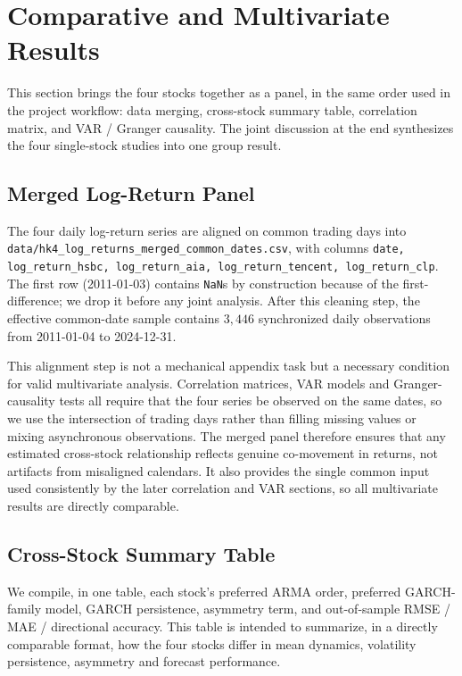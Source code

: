 \documentclass[11pt,a4paper]{article}
\begin{document}
\section{Comparative and Multivariate Results}
\label{sec:compare}

This section brings the four stocks together as a panel, in the
same order used in the project workflow: data merging, cross-stock
summary table, correlation matrix, and VAR / Granger causality.  The
joint discussion at the end synthesizes the four single-stock studies
into one group result.

\subsection{Merged Log-Return Panel}
\label{sec:compare-merge}
The four daily log-return series are aligned on common trading days
into \texttt{data/hk4\_log\_returns\_merged\_common\_dates.csv}, with
columns \texttt{date, log\_return\_hsbc, log\_return\_aia,
log\_return\_tencent, log\_return\_clp}.  The first row (2011-01-03)
contains \texttt{NaN}s by construction because of the
first-difference; we drop it before any joint analysis.  After this
cleaning step, the effective common-date sample contains
$3{,}446$ synchronized daily observations from 2011-01-04 to
2024-12-31.

This alignment step is not a mechanical appendix task but a necessary
condition for valid multivariate analysis.  Correlation matrices,
VAR models and Granger-causality tests all require that the four
series be observed on the same dates, so we use the intersection of
trading days rather than filling missing values or mixing asynchronous
observations.  The merged panel therefore ensures that any estimated
cross-stock relationship reflects genuine co-movement in returns,
not artifacts from misaligned calendars.  It also provides the single
common input used consistently by the later correlation and VAR
sections, so all multivariate results are directly comparable.

\subsection{Cross-Stock Summary Table}
\label{sec:compare-table}
We compile, in one table, each stock's preferred ARMA order,
preferred GARCH-family model, GARCH persistence, asymmetry term,
and out-of-sample RMSE / MAE / directional accuracy.  This table is
intended to summarize, in a directly comparable format, how the four
stocks differ in mean dynamics, volatility persistence, asymmetry and
forecast performance.
\end{document}
